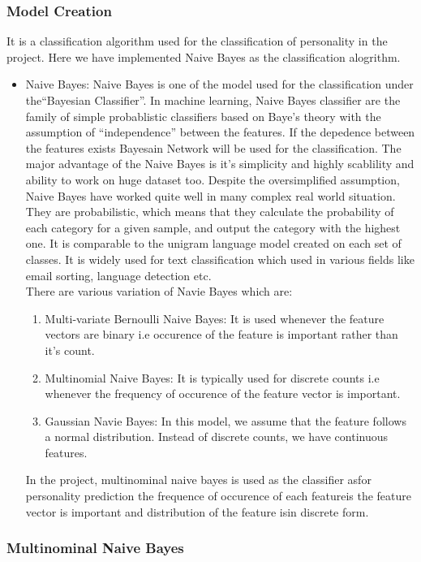 \subsubsection{Model Creation}
It is a classification algorithm used for the classification of personality in the project. Here we have implemented Naive Bayes as the classification alogrithm.
\begin{itemize}
\item Naive Bayes: 
Naive Bayes is one of the model used for the classification under the``Bayesian Classifier''. In machine learning, Naive Bayes classifier are the family of simple probablistic classifiers based on Baye's theory with the assumption of ``independence'' between the features. If the depedence between the features exists Bayesain Network will be used for the classification. The major advantage of the Naive Bayes is it's simplicity and highly scablility and ability to work on huge dataset too. Despite the oversimplified assumption, Naive Bayes have worked quite well in many complex real world situation.
They are probabilistic, which means that they calculate the probability of each category for a given sample, and output the category with the highest one. It is comparable to the unigram language model created on each set of classes. It is widely used for text classification which used in various fields like email sorting, language detection etc. \\
There are various variation of Navie Bayes which are:
\begin{enumerate}
\item Multi-variate Bernoulli Naive Bayes: It is used whenever the feature vectors are binary i.e occurence of the feature is important rather than it's count.
\item Multinomial Naive Bayes: It is typically used for discrete counts i.e whenever the frequency of occurence of the feature vector is important.
\item Gaussian Navie Bayes: In this model, we assume that the feature follows a normal distribution. Instead of discrete counts, we have continuous features.
\end{enumerate}
In the project, multinominal naive bayes is used as the classifier asfor personality prediction the frequence of occurence of each featureis the feature vector is important and distribution of the feature isin discrete form.
\end{itemize}

\subsubsection{Multinominal Naive Bayes}
